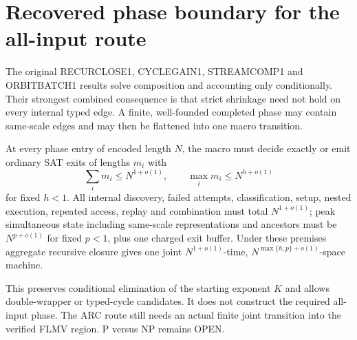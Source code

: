 \section{Recovered phase boundary for the all-input route}
The original RECURCLOSE1, CYCLEGAIN1, STREAMCOMP1 and ORBITBATCH1 results
solve composition and accounting only conditionally.  Their strongest
combined consequence is that strict shrinkage need not hold on every
internal typed edge.  A finite, well-founded completed phase may contain
same-scale edges and may then be flattened into one macro transition.

At every phase entry of encoded length $N$, the macro must decide exactly or
emit ordinary SAT exits of lengths $m_i$ with
\[
 \sum_i m_i\le N^{1+o(1)},\qquad
 \max_i m_i\le N^{h+o(1)}
\]
for fixed $h<1$.  All internal discovery, failed attempts, classification,
setup, nested execution, repeated access, replay and combination must total
$N^{1+o(1)}$; peak simultaneous state including same-scale representations
and ancestors must be $N^{p+o(1)}$ for fixed $p<1$, plus one charged exit
buffer.  Under these premises aggregate recursive closure gives one joint
$N^{1+o(1)}$-time, $N^{\max\{h,p\}+o(1)}$-space machine.

This preserves conditional elimination of the starting exponent $K$ and
allows double-wrapper or typed-cycle candidates.  It does not construct the
required all-input phase.  The ARC route still needs an actual finite joint
transition into the verified FLMV region.  P versus NP remains OPEN.
